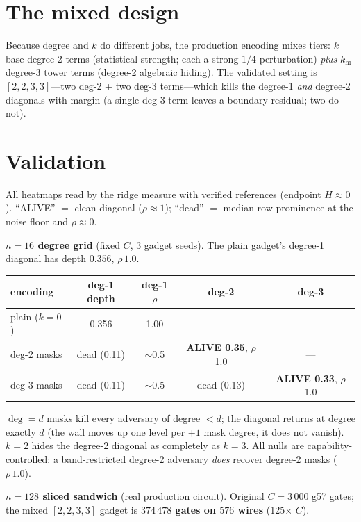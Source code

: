 \documentclass[11pt]{article}
\begin{document}
\section{The mixed design}\label{sec:mixed}

Because degree and $k$ do different jobs, the production encoding mixes tiers:
$k$ base degree-2 terms (statistical strength; each a strong $1/4$ perturbation)
\emph{plus} $k_{\mathrm{hi}}$ degree-3 tower terms (degree-2 algebraic hiding).
The validated setting is $[2,2,3,3]$---two deg-2 + two deg-3 terms---which kills
the degree-1 \emph{and} degree-2 diagonals with margin (a single deg-3 term
leaves a boundary residual; two do not).

\section{Validation}

All heatmaps read by the ridge measure with verified references (endpoint
$H\approx0$). ``ALIVE'' $=$ clean diagonal ($\rho\approx1$); ``dead'' $=$
median-row prominence at the noise floor and $\rho\approx0$.

\textbf{$n=16$ degree grid} (fixed $C$, 3 gadget seeds). The plain gadget's
degree-1 diagonal has depth $0.356$, $\rho\,1.0$.

\begin{center}
\begin{tabular}{lcccc}
\toprule
encoding & deg-1 depth & deg-1 $\rho$ & deg-2 & deg-3 \\
\midrule
plain ($k=0$) & 0.356 & 1.00 & --- & --- \\
deg-2 masks & dead (0.11) & $\sim$0.5 & \textbf{ALIVE 0.35}, $\rho$ 1.0 & --- \\
deg-3 masks & dead (0.11) & $\sim$0.5 & dead (0.13) & \textbf{ALIVE 0.33}, $\rho$ 1.0 \\
\bottomrule
\end{tabular}
\end{center}

\noindent $\deg=d$ masks kill every adversary of degree $<d$; the diagonal
returns at degree exactly $d$ (the wall moves up one level per $+1$ mask degree,
it does not vanish). $k=2$ hides the degree-2 diagonal as completely as $k=3$.
All nulls are capability-controlled: a band-restricted degree-2 adversary
\emph{does} recover degree-2 masks ($\rho\,1.0$).

\textbf{$n=128$ sliced sandwich} (real production circuit). Original $C=3\,000$
g57 gates; the mixed $[2,2,3,3]$ gadget is \textbf{$374\,478$ gates on $576$
wires} (125$\times$ $C$).
\end{document}
